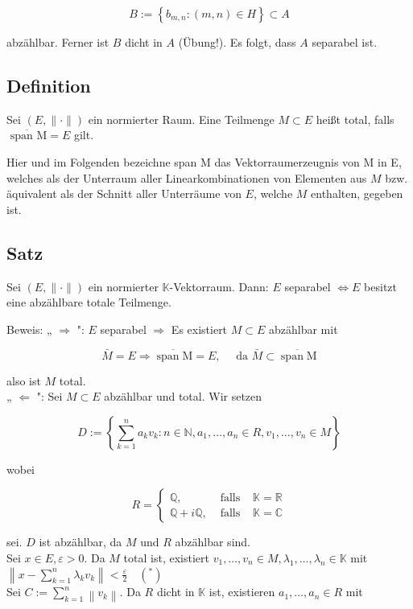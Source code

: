\documentclass[10pt, letterpaper]{article}
\begin{document}
$$
B:=\left\{b_{m, n}:(m, n) \in H\right\} \subset A
$$

abzählbar. Ferner ist $B$ dicht in $A$ (Übung!). Es folgt, dass $A$ separabel ist.

\subsection*{Definition}
Sei $(E,\|\cdot\|)$ ein normierter Raum. Eine Teilmenge $M \subset E$ heißt total, falls $\overline{\text { span } \mathrm{M}}= E$ gilt.

Hier und im Folgenden bezeichne span M das Vektorraumerzeugnis von M in E, welches als der Unterraum aller Linearkombinationen von Elementen aus $M$ bzw. äquivalent als der Schnitt aller Unterräume von $E$, welche $M$ enthalten, gegeben ist.

\subsection*{Satz}
Sei $(E,\|\cdot\|)$ ein normierter $\mathbb{K}$-Vektorraum. Dann: $E$ separabel $\Longleftrightarrow E$ besitzt eine abzählbare totale Teilmenge.

Beweis: „ $\Longrightarrow$ ": $E$ separabel $\Longrightarrow$ Es existiert $M \subset E$ abzählbar mit

$$
\bar{M}=E \Longrightarrow \overline{\operatorname{span} \mathrm{M}}=E, \quad \text { da } \bar{M} \subset \overline{\operatorname{span} \mathrm{M}}
$$

also ist $M$ total.\\
„ $\Longleftarrow$ ": Sei $M \subset E$ abzählbar und total. Wir setzen

$$
D:=\left\{\sum_{k=1}^{n} a_{k} v_{k}: n \in \mathbb{N}, a_{1}, \ldots, a_{n} \in R, v_{1}, \ldots, v_{n} \in M\right\}
$$

wobei

$$
R=\left\{\begin{array}{lll}
\mathbb{Q}, & \text { falls } & \mathbb{K}=\mathbb{R} \\
\mathbb{Q}+i \mathbb{Q}, & \text { falls } & \mathbb{K}=\mathbb{C}
\end{array}\right.
$$

sei. $D$ ist abzählbar, da $M$ und $R$ abzählbar sind.\\
Sei $x \in E, \varepsilon>0$. Da $M$ total ist, existiert $v_{1}, \ldots, v_{n} \in M, \lambda_{1}, \ldots, \lambda_{n} \in \mathbb{K}$ mit $\left\|x-\sum_{k=1}^{n} \lambda_{k} v_{k}\right\|<\frac{\varepsilon}{2} \quad\left(^{*}\right)$\\
Sei $C:=\sum_{k=1}^{n}\left\|v_{k}\right\|$. Da $R$ dicht in $\mathbb{K}$ ist, existieren $a_{1}, \ldots, a_{n} \in R$ mit
\end{document}
